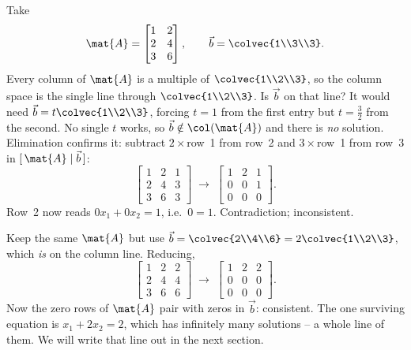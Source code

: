 \begin{example}
\label{ch13:incon}
Take
\[
  \mat{A}=\begin{bmatrix}1&2\\2&4\\3&6\end{bmatrix},\qquad
  \vec{b}=\colvec{1\\3\\3}.
\]
Every column of $\mat{A}$ is a multiple of $\colvec{1\\2\\3}$, so the column space is the
single line through $\colvec{1\\2\\3}$. Is $\vec{b}$ on that line? It would need
$\vec{b}=t\colvec{1\\2\\3}$, forcing $t=1$ from the first entry but $t=\tfrac32$ from the
second. No single $t$ works, so $\vec{b}\notin\col(\mat{A})$ and there is \emph{no}
solution. Elimination confirms it: subtract $2\times$row~1 from row~2 and $3\times$row~1
from row~3 in $[\,\mat{A}\mid\vec{b}\,]$:
\[
  \left[\begin{array}{cc|c}1&2&1\\2&4&3\\3&6&3\end{array}\right]
  \;\longrightarrow\;
  \left[\begin{array}{cc|c}1&2&1\\0&0&1\\0&0&0\end{array}\right].
\]
Row~2 now reads $0x_1+0x_2=1$, i.e.\ $0=1$. Contradiction; inconsistent.
\end{example}

\begin{example}
\label{ch13:con}
Keep the same $\mat{A}$ but use $\vec{b}=\colvec{2\\4\\6}=2\colvec{1\\2\\3}$, which
\emph{is} on the column line. Reducing,
\[
  \left[\begin{array}{cc|c}1&2&2\\2&4&4\\3&6&6\end{array}\right]
  \;\longrightarrow\;
  \left[\begin{array}{cc|c}1&2&2\\0&0&0\\0&0&0\end{array}\right].
\]
Now the zero rows of $\mat{A}$ pair with zeros in $\vec{b}$: consistent. The one surviving
equation is $x_1+2x_2=2$, which has infinitely many solutions -- a whole line of them. We
will write that line out in the next section.
\end{example}

